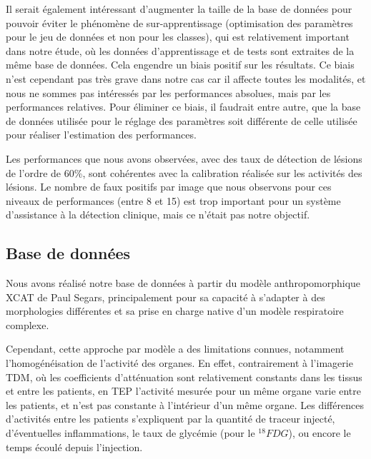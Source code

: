 Il serait également intéressant d'augmenter la taille de la base de données
pour pouvoir éviter le phénomène de sur-apprentissage (optimisation
des paramètres pour le jeu de données et non pour les classes), qui est
relativement important dans notre étude, où les données d'apprentissage et
de tests sont extraites de la même base de données. Cela engendre un biais
positif sur les résultats. Ce biais n'est cependant pas très grave dans notre cas car
il affecte toutes les modalités, et nous ne sommes pas intéressés par les
performances absolues, mais par les performances relatives.
Pour éliminer ce biais, il faudrait entre autre, que la base de données utilisée
pour le réglage des paramètres soit différente de celle utilisée pour réaliser
l'estimation des performances.

Les performances que nous avons observées, avec des taux de détection de lésions
de l'ordre de 60\%, sont cohérentes avec la calibration réalisée sur les
activités des lésions. Le nombre de faux positifs par image que nous observons
pour ces niveaux de performances (entre 8 et 15) est trop important pour un
système d'assistance à la détection clinique, mais ce n'était pas notre
objectif.
 

\subsection{Base de données}

Nous avons réalisé notre base de données à partir du modèle anthropomorphique
XCAT de Paul Segars, principalement pour sa capacité à s'adapter à des
morphologies différentes et sa prise en charge native d'un modèle respiratoire
complexe. 

Cependant, cette approche par modèle a des limitations connues, notamment
l'homogénéisation de l'activité des organes. En effet, contrairement à
l'imagerie TDM, où les coefficients d'atténuation sont relativement constants
dans les tissus et entre les patients, en TEP l'activité mesurée pour un même
organe varie entre les patients, et n'est pas constante à l'intérieur d'un même
organe. Les différences d'activités entre les patients s'expliquent par la
quantité de traceur injecté, d'éventuelles inflammations, le taux de glycémie
(pour le $^{18}FDG$), ou encore le temps écoulé depuis l'injection.  

